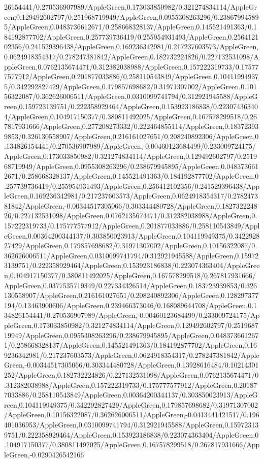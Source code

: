 {\begin{tikzternal}
{26154441/0.270536907989/AppleGreen,0.173033850982/0.321274834114/AppleGreen,0.129492602797/0.251968719949/AppleGreen,0.0955308263296/0.238679945895/AppleGreen,0.0483736612671/0.258668328137/AppleGreen,0.145521491363/0.184192877702/AppleGreen,0.257739736419/0.255954931493/AppleGreen,0.256412102356/0.241529396438/AppleGreen,0.169236342981/0.217237603573/AppleGreen,0.0624918354317/0.278247381842/AppleGreen,0.182732224826/0.227132531098/AppleGreen,0.0762135674471/0.312382038988/AppleGreen,0.157222319733/0.175777577912/AppleGreen,0.201877033886/0.258110543849/AppleGreen,0.104119949375/0.342292827429/AppleGreen,0.179857698682/0.31971307002/AppleGreen,0.10156322087/0.362626006511/AppleGreen,0.0310099741794/0.312921945588/AppleGreen,0.159723139751/0.222358929464/AppleGreen,0.153923186838/0.223074363404/AppleGreen,0.104917150377/0.380811492025/AppleGreen,0.167578299518/0.267817931666/AppleGreen,0.277208273332/0.222464855114/AppleGreen,0.183723939853/0.326130558907/AppleGreen,0.216161027651/0.208240892306/AppleGreen,0.134826154441/0.270536907989/AppleGreen,-0.00460123684499/0.233009724175/AppleGreen,0.173033850982/0.321274834114/AppleGreen,0.129492602797/0.251968719949/AppleGreen,0.0955308263296/0.238679945895/AppleGreen,0.0483736612671/0.258668328137/AppleGreen,0.145521491363/0.184192877702/AppleGreen,0.257739736419/0.255954931493/AppleGreen,0.256412102356/0.241529396438/AppleGreen,0.169236342981/0.217237603573/AppleGreen,0.0624918354317/0.278247381842/AppleGreen,-0.00344517305066/0.303344480728/AppleGreen,0.182732224826/0.227132531098/AppleGreen,0.0762135674471/0.312382038988/AppleGreen,0.157222319733/0.175777577912/AppleGreen,0.201877033886/0.258110543849/AppleGreen,0.00364200344137/0.303850023913/AppleGreen,0.104119949375/0.342292827429/AppleGreen,0.179857698682/0.31971307002/AppleGreen,0.10156322087/0.362626006511/AppleGreen,0.0310099741794/0.312921945588/AppleGreen,0.159723139751/0.222358929464/AppleGreen,0.153923186838/0.223074363404/AppleGreen,0.104917150377/0.380811492025/AppleGreen,0.167578299518/0.267817931666/AppleGreen,0.0377535719349/0.227334326514/AppleGreen,0.183723939853/0.326130558907/AppleGreen,0.216161027651/0.208240892306/AppleGreen,0.128297377194/0.13463900606/AppleGreen,0.239466373046/0.168089644708/AppleGreen,0.134826154441/0.270536907989/AppleGreen,-0.00460123684499/0.233009724175/AppleGreen,0.173033850982/0.321274834114/AppleGreen,0.129492602797/0.251968719949/AppleGreen,0.0955308263296/0.238679945895/AppleGreen,0.0483736612671/0.258668328137/AppleGreen,0.145521491363/0.184192877702/AppleGreen,0.169236342981/0.217237603573/AppleGreen,0.0624918354317/0.278247381842/AppleGreen,-0.00344517305066/0.303344480728/AppleGreen,0.13928616484/0.10214301252/AppleGreen,0.182732224826/0.227132531098/AppleGreen,0.0762135674471/0.312382038988/AppleGreen,0.157222319733/0.175777577912/AppleGreen,0.201877033886/0.258110543849/AppleGreen,0.00364200344137/0.303850023913/AppleGreen,0.104119949375/0.342292827429/AppleGreen,0.179857698682/0.31971307002/AppleGreen,0.10156322087/0.362626006511/AppleGreen,-0.0413441421517/0.196401036953/AppleGreen,0.0310099741794/0.312921945588/AppleGreen,0.159723139751/0.222358929464/AppleGreen,0.153923186838/0.223074363404/AppleGreen,0.104917150377/0.380811492025/AppleGreen,0.167578299518/0.267817931666/AppleGreen,-0.0290426542166}
\end{tikzternal}}
